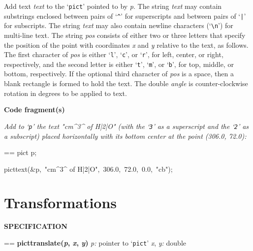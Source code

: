 \documentclass{book}
\makeatletter
\newcommand\Texinfocommandstyletextvar[1]{{\normalfont{}\textsl{#1}}}%
\newenvironment{Texinfopreformatted}{%
  \par\GNUTobeylines\obeyspaces\frenchspacing\parskip=\z@\parindent=\z@}{}
{\catcode`\^^M=13 \gdef\GNUTobeylines{\catcode`\^^M=13 \def^^M{\null\par}}}
\newenvironment{Texinfoindented}{\begin{list}{}{}\item\relax}{\end{list}}
\renewcommand{\_}{\Texinfounderscore\discretionary{}{}{}}
\makeatother
\begin{document}
Add text \Texinfocommandstyletextvar{text} to the `\texttt{pict}' pointed to by \Texinfocommandstyletextvar{p}.
The string \Texinfocommandstyletextvar{text} may contain substrings enclosed between pairs of
`\texttt{\^{}}' for superscripts and between pairs of `\texttt{|}' for subscripts.
The string \Texinfocommandstyletextvar{text} may also contain newline characters (`\texttt{\textbackslash{}n}')
for multi-line text.
The string \Texinfocommandstyletextvar{pos} consists of either two or three letters that
specify the position of the point with coordinates
\Texinfocommandstyletextvar{x} and \Texinfocommandstyletextvar{y}
relative to the text, as follows.
The first character of \Texinfocommandstyletextvar{pos} is either `\texttt{l}', `\texttt{c}', or `\texttt{r}',
for left, center, or right, respectively, and the
second letter is either `\texttt{t}', `\texttt{m}', or `\texttt{b}',
for top, middle, or bottom, respectively.
If the optional third character of \Texinfocommandstyletextvar{pos}
is a space, then a blank rectangle is formed to hold the text.
The double \Texinfocommandstyletextvar{angle} is counter-clockwise rotation in degrees to be applied to text.

\noindent{}\textbf{Code fragment(s)}

\emph{Add to `\texttt{p}' the text "cm\^{}3\^{} of H|2|O" (with the
`\texttt{3}' as a superscript and the `\texttt{2}' as a subscript) placed
horizontally with its bottom center at the point
(306.0, 72.0):}
\begin{Texinfoindented}
\begin{Texinfopreformatted}%
\ttfamily pict p;

pict\_text(\&p,\ "cm\^{}3\^{} of H|2|O",\ 306.0,\ 72.0,\ 0.0,\ "cb");
\end{Texinfopreformatted}
\end{Texinfoindented}

\section{{Transformations}}
\label{anchor:Transformations}%

\noindent{}\textbf{SPECIFICATION}
\begin{Texinfoindented}
\begin{Texinfopreformatted}%
\textbf{pict\_translate(\Texinfocommandstyletextvar{p}, \Texinfocommandstyletextvar{x}, \Texinfocommandstyletextvar{y})}
\Texinfocommandstyletextvar{p:} pointer to `\texttt{pict}'
\Texinfocommandstyletextvar{x}, \Texinfocommandstyletextvar{y:} double
\end{Texinfopreformatted}
\end{Texinfoindented}
%
%
%
%
%
%
\end{document}
